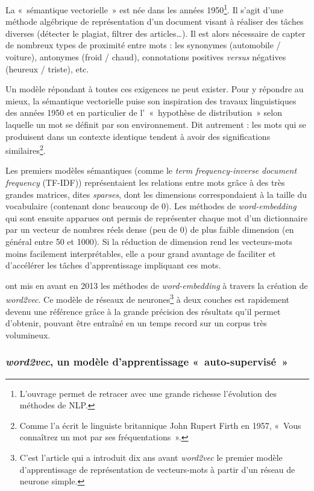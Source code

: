 \documentclass[11pt,french,french]{article}
\let\rmarkdownfootnote\footnote%
\def\footnote{\protect\rmarkdownfootnote}
\begin{document}
La «~sémantique vectorielle~» est née dans les années 1950\footnote{L'ouvrage
  \cite{Jurafsky} permet de retracer avec une grande richesse
  l'évolution des méthodes de NLP.}. Il s'agit d'une méthode algébrique
de représentation d'un document visant à réaliser des tâches diverses
(détecter le plagiat, filtrer des articles\dots). Il est alors
nécessaire de capter de nombreux types de proximité entre mots : les
synonymes (automobile / voiture), antonymes (froid / chaud),
connotations positives \emph{versus} négatives (heureux / triste), etc.

Un modèle répondant à toutes ces exigences ne peut exister. Pour y
répondre au mieux, la sémantique vectorielle puise son inspiration des
travaux linguistiques des années 1950 et en particulier de
l'~«~hypothèse de distribution~» selon laquelle un mot se définit par
son environnement. Dit autrement : les mots qui se produisent dans un
contexte identique tendent à avoir des significations
similaires\footnote{Comme l'a écrit le linguiste britannique John Rupert
  Firth en 1957, «~Vous connaîtrez un mot par ses fréquentations~».}.

Les premiers modèles sémantiques (comme le \emph{term frequency-inverse
document frequency} (TF-IDF)) représentaient les relations entre mots
grâce à des très grandes matrices, dites \emph{sparses}, dont les
dimensions correspondaient à la taille du vocabulaire (contenant donc
beaucoup de 0). Les méthodes de \emph{word-embedding} qui sont ensuite
apparues ont permis de représenter chaque mot d'un dictionnaire par un
vecteur de nombres réels dense (peu de 0) de plus faible dimension (en
général entre 50 et 1000). Si la réduction de dimension rend les
vecteurs-mots moins facilement interprétables, elle a pour grand
avantage de faciliter et d'accélérer les tâches d'apprentissage
impliquant ces mots.

\cite{Mikolov} ont mis en avant en 2013 les méthodes de
\emph{word-embedding} à travers la création de \emph{word2vec}. Ce
modèle de réseaux de neurones\footnote{C'est l'article \cite{Bengio} qui
  a introduit dix ans avant \emph{word2vec} le premier modèle
  d'apprentissage de représentation de vecteurs-mots à partir d'un
  réseau de neurone simple.} à deux couches est rapidement devenu une
référence grâce à la grande précision des résultats qu'il permet
d'obtenir, pouvant être entraîné en un temps record sur un corpus très
volumineux.

\subsubsection{\texorpdfstring{\emph{word2vec}, un modèle
d'apprentissage
«~auto-supervisé~»}{word2vec, un modèle d'apprentissage «~auto-supervisé~»}}\label{subsec:word2vec}
\end{document}
